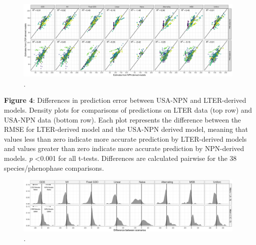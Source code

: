 \documentclass[fleqn,12pt,lineno]{article}
\begin{document}
\newpage

\begin{figure}[H]
	\centering
		\includegraphics[scale=0.5, angle=90]{figure_estimate_compare.png}
	\caption{.}
\end{figure}


\newpage

\textbf{Figure 4}: Differences in prediction error between USA-NPN and LTER-derived models. Density plots for comparisons of predictions on LTER data (top row) and USA-NPN data (bottom row). Each plot represents the difference between the RMSE for LTER-derived model and the USA-NPN derived model, meaning that values less than zero indicate more accurate prediction by LTER-derived models and values greater than zero indicate more accurate prediction by NPN-derived models. \textit{p} <0.001 for all t-tests. Differences are calculated pairwise for the 38 species/phenophase comparisons.

\newpage

\begin{figure}[H]
	\centering
		\includegraphics[scale=0.4, angle=90]{figure_rmse_metrics_density_plot.png}
	\caption{.}
\end{figure}
\end{document}
